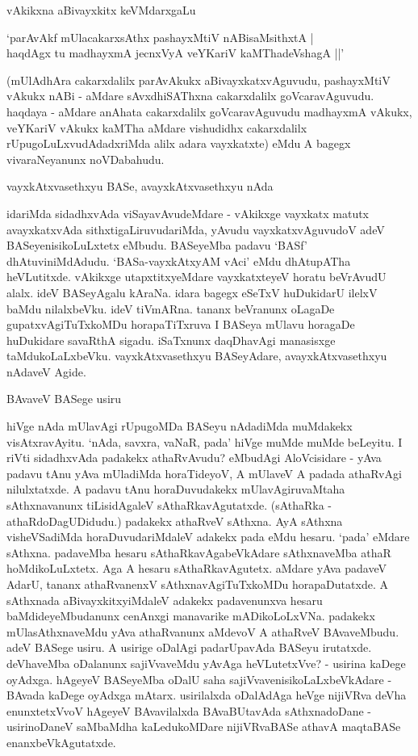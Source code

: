 vAkikxna aBivayxkitx keVMdarxgaLu

\begin{shloka}
`parAvAkf mUlacakarxsAthx pashayxMtiV nABisaMsithxtA |\\
haqdAgx tu madhayxmA jecnxVyA veYKariV kaMThadeVshagA ||'
\end{shloka}

(mUlAdhAra cakarxdalilx parAvAkukx aBivayxkatxvAguvudu, pashayxMtiV vAkukx nABi - aMdare sAvxdhiSAThxna cakarxdalilx goVcaravAguvudu. haqdaya - aMdare anAhata cakarxdalilx goVcaravAguvudu madhayxmA vAkukx, veYKariV vAkukx kaMTha aMdare vishudidhx cakarxdalilx rUpugoLuLxvudAdadxriMda alilx adara vayxkatxte) eMdu A bagegx vivaraNeyanunx noVDabahudu.

vayxkAtxvasethxyu BASe, avayxkAtxvasethxyu nAda

idariMda sidadhxvAda viSayavAvudeMdare - vAkikxge vayxkatx matutx avayxkatxvAda sithxtigaLiruvudariMda, yAvudu vayxkatxvAguvudoV adeV BASeyenisikoLuLxtetx eMbudu. BASeyeMba padavu `BASf' dhAtuviniMdAdudu. `BASa-vayxkAtxyAM vAci' eMdu dhAtupATha heVLutitxde. vAkikxge utapxtitxyeMdare vayxkatxteyeV horatu beVrAvudU alalx. ideV BASeyAgalu kAraNa. idara bagegx eSeTxV huDukidarU ilelxV baMdu nilalxbeVku. ideV tiVmARna. tananx beVranunx oLagaDe gupatxvAgiTuTxkoMDu horapaTiTxruva I BASeya mUlavu horagaDe huDukidare savaRthA sigadu. iSaTxnunx daqDhavAgi manasisxge taMdukoLaLxbeVku. vayxkAtxvasethxyu BASeyAdare, avayxkAtxvasethxyu nAdaveV Agide.

BAvaveV BASege usiru

hiVge nAda mUlavAgi rUpugoMDa BASeyu nAdadiMda muMdakekx visAtxravAyitu. `nAda, savxra, vaNaR, pada' hiVge muMde muMde beLeyitu. I riVti sidadhxvAda padakekx athaRvAvudu? eMbudAgi AloVcisidare - yAva padavu tAnu yAva mUladiMda horaTideyoV, A mUlaveV A padada athaRvAgi nilulxtatxde. A padavu tAnu horaDuvudakekx mUlavAgiruvaMtaha sAthxnavanunx tiLisidAgaleV sAthaRkavAgutatxde. (sAthaRka - athaRdoDagUDidudu.) padakekx athaRveV sAthxna. AyA sAthxna visheVSadiMda horaDuvudariMdaleV adakekx pada eMdu hesaru. `pada' eMdare sAthxna. padaveMba hesaru sAthaRkavAgabeVkAdare sAthxnaveMba athaR hoMdikoLuLxtetx. Aga A hesaru sAthaRkavAgutetx. aMdare yAva padaveV AdarU, tananx athaRvanenxV sAthxnavAgiTuTxkoMDu horapaDutatxde. A sAthxnada aBivayxkitxyiMdaleV adakekx padavenunxva hesaru baMdideyeMbudanunx cenAnxgi manavarike mADikoLoLxVNa. padakekx mUlasAthxnaveMdu yAva athaRvanunx aMdevoV A athaRveV BAvaveMbudu. adeV BASege usiru. A usirige oDalAgi padarUpavAda BASeyu irutatxde. deVhaveMba oDalanunx sajiVvaveMdu yAvAga heVLutetxVve? - usirina kaDege oyAdxga. hAgeyeV BASeyeMba oDalU saha sajiVvavenisikoLaLxbeVkAdare - BAvada kaDege oyAdxga mAtarx. usirilalxda oDalAdAga heVge nijiVRva deVha enunxtetxVvoV hAgeyeV BAvavilalxda BAvaBUtavAda sAthxnadoDane - usirinoDaneV saMbaMdha kaLedukoMDare nijiVRvaBASe athavA maqtaBASe enanxbeVkAgutatxde.

